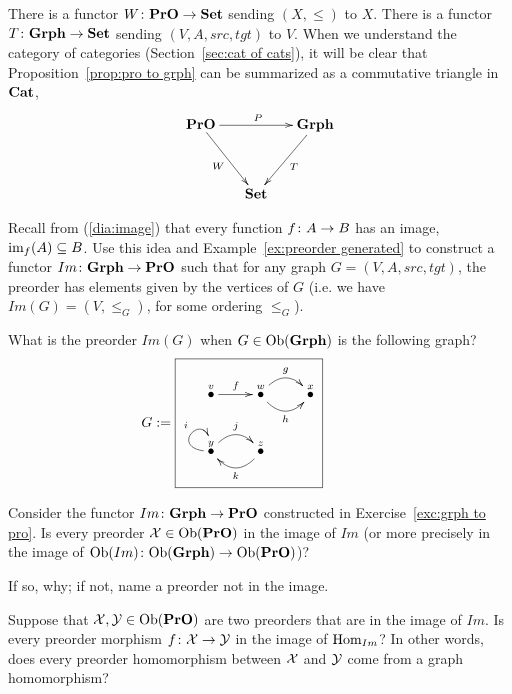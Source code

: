 \documentclass[CT4S-EN-RU]{subfiles}
\begin{document}
\begin{exerciseRUS}
\end{exerciseRUS}

\begin{remarkENG}
There is a functor $W\colon{\mathbf{PrO}}\rightarrow{\mathbf{Set}}$ sending $(X,\leq)$ to $X$. There is a functor $T\colon{\mathbf{Grph}}\rightarrow{\mathbf{Set}}$ sending $(V,A,src,tgt)$ to $V$. When we understand the category of categories (Section~\ref{sec:cat of cats}), it will be clear that Proposition~\ref{prop:pro to grph} can be summarized as a commutative triangle in ${\mathbf{Cat}}$, 
$$
\xymatrix@=15pt{\PrO\ar[rr]^P\ar[ddr]_W&&\Grph\ar[ddl]^T\\\\&\Set}
$$
\end{remarkENG}

\begin{remarkRUS}
\end{remarkRUS}

\begin{exerciseENG}\label{exc:grph to pro}
Recall from (\ref{dia:image}) that every function $f\colon A\rightarrow B$ has an image, $\textnormal{im}_f(A)\subseteq B$. Use this idea and Example~\ref{ex:preorder generated} to construct a functor $Im\colon{\mathbf{Grph}}\rightarrow{\mathbf{PrO}}$ such that for any graph $G=(V,A,src,tgt)$, the preorder has elements given by the vertices of $G$ (i.e. we have $Im(G)=(V,\leq_G)$, for some ordering $\leq_G$).
\end{exerciseENG}

\begin{exerciseRUS}\label{exc:grph to pro}
\end{exerciseRUS}

\begin{exerciseENG}
What is the preorder $Im(G)$ when $G\in\textnormal{Ob}({\mathbf{Grph}})$ is the following graph?
$$
G:=\parbox{2in}{\fbox{\xymatrix{\LMO{v}\ar[r]^f&\LMO{w}\ar@/_1pc/[r]_h\ar@/^1pc/[r]^g&\LMO{x}\\\LMO{y}\ar@(l,u)[]^i\ar@/^1pc/[r]^j&\LMO{z}\ar@/^1pc/[l]^k}}}
$$
\end{exerciseENG}

\begin{exerciseRUS}
\end{exerciseRUS}

\begin{exerciseENG}
Consider the functor $Im\colon{\mathbf{Grph}}\rightarrow{\mathbf{PrO}}$ constructed in Exercise~\ref{exc:grph to pro}.
\sexc Is every preorder $\mathcal{X}\in\textnormal{Ob}({\mathbf{PrO}})$ in the image of $Im$ (or more precisely in the image of $\textnormal{Ob}(Im)\colon\textnormal{Ob}({\mathbf{Grph}})\rightarrow\textnormal{Ob}({\mathbf{PrO}})$)?
\item If so, why; if not, name a preorder not in the image.
\item Suppose that $\mathcal{X},\mathcal{Y}\in\textnormal{Ob}({\mathbf{PrO}})$ are two preorders that are in the image of $Im$. Is every preorder morphism $f\colon\mathcal{X}\rightarrow\mathcal{Y}$ in the image of $\textnormal{Hom}_{Im}$? In other words, does every preorder homomorphism between $\mathcal{X}$ and $\mathcal{Y}$ come from a graph homomorphism?
\endsexc
\end{exerciseENG}
\end{document}

